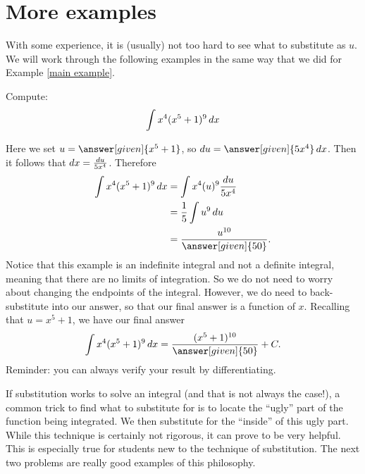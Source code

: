 \documentclass{ximera}
\begin{document}
\section{More examples}

With some experience, it is (usually) not too hard to see what to
substitute as $u$.  We will work through the following examples in the
same way that we did for Example \ref{main example}.
\begin{example}
Compute:
\[
\int x^4(x^5+1)^{9} \mathop{}\!d x
\]
\begin{explanation}
Here we set $u =  \answer[given]{x^5+1}$, so $\d u =  \answer[given]{5x^4} \d x$.  Then
it follows that $\mathop{}\!d x=\frac{\mathop{}\!d u}{5x^4}$. Therefore
\begin{align*}
  \int x^4(x^5+1)^{9} \d x &= \int x^4 (u)^{9} \frac{\d u}{5x^4} \\
  &= \frac{1}{5} \int u^{9} \d u\\
&=\frac{u^{10}}{ \answer[given]{50}}.
\end{align*}
Notice that this example is an indefinite integral and not a definite
integral, meaning that there are no limits of integration.  So we do
not need to worry about changing the endpoints of the integral.  However,
we do need to back-substitute into our answer, so that our final
answer is a function of $x$.  Recalling that $u= x^5+1$, we have
our final answer
\[
\int x^4(x^5+1)^{9} \d x= \frac{(x^5+1)^{10}}{\answer[given]{50}}+C.
\]
Reminder: you can always verify your result by differentiating.

\end{explanation}
\end{example}


If substitution works to solve an integral (and that is not always the
case!), a common trick to find what to substitute for is to locate the
``ugly'' part of the function being integrated.  We then substitute
for the ``inside'' of this ugly part.  While this technique is
certainly not rigorous, it can prove to be very helpful.  This is
especially true for students new to the technique of substitution.
The next two problems are really good examples of this philosophy.
\end{document}
